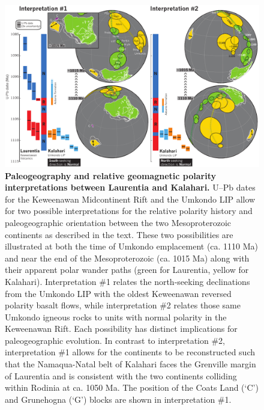 \documentclass[11pt,letterpaper]{article}
\begin{document}
\begin{figure}[h!]
\begin{adjustwidth}{-0.7in}{0in}
\includegraphics[width=7.9 in]{figures/reconstruction.pdf}
\end{adjustwidth}
\caption{\textbf{Paleogeography and relative geomagnetic polarity interpretations between Laurentia and Kalahari.} U--Pb dates for the Keweenawan Midcontinent Rift \citep{Davis1997a, Swanson-Hysell2014a} and the Umkondo LIP \citep{Hanson2004a} allow for two possible interpretations for the relative polarity history and paleogeographic orientation between the two Mesoproterozoic continents as described in the text. These two possibilities are illustrated at both the time of Umkondo emplacement (ca. 1110 Ma) and near the end of the Mesoproterozoic (ca. 1015 Ma) along with their apparent polar wander paths (green for Laurentia, yellow for Kalahari). Interpretation $\#$1 relates the north-seeking declinations from the Umkondo LIP with the oldest Keweenawan reversed polarity basalt flows, while interpretation $\#$2 relates those same Umkondo igneous rocks to units with normal polarity in the Keweenawan Rift. Each possibility has distinct implications for paleogeographic evolution. In contrast to interpretation $\#$2, interpretation $\#$1 allows for the continents to be reconstructed such that the Namaqua-Natal belt of Kalahari faces the Grenville margin of Laurentia and is consistent with the two continents colliding within Rodinia at ca. 1050 Ma. The position of the Coats Land (`C') and Grunehogna (`G') blocks are shown in interpretation $\#$1.}
\label{fig:reconstruction}
\end{figure}
\end{document}
